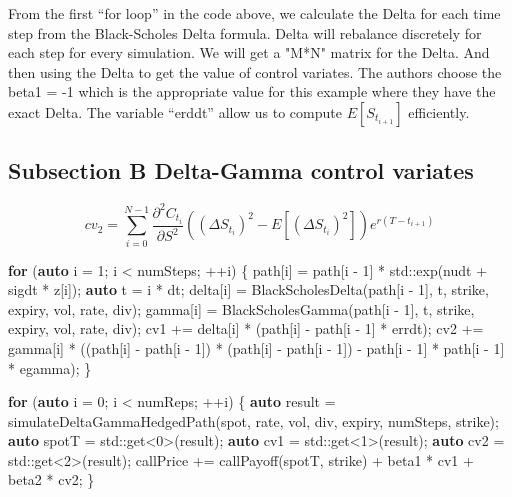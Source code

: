 \documentclass[11pt,]{article}
\newenvironment{Shaded}{\begin{snugshade}}{\end{snugshade}}
\newcommand{\BuiltInTok}[1]{#1}
\newcommand{\ControlFlowTok}[1]{\textcolor[rgb]{0.13,0.29,0.53}{\textbf{#1}}}
\newcommand{\DecValTok}[1]{\textcolor[rgb]{0.00,0.00,0.81}{#1}}
\newcommand{\KeywordTok}[1]{\textcolor[rgb]{0.13,0.29,0.53}{\textbf{#1}}}
\newcommand{\NormalTok}[1]{#1}
\begin{document}
From the first ``for loop'' in the code above, we calculate the Delta
for each time step from the Black-Scholes Delta formula. Delta will
rebalance discretely for each step for every simulation. We will get a
"M*N" matrix for the Delta. And then using the Delta to get the value of
control variates. The authors choose the beta1 = -1 which is the
appropriate value for this example where they have the exact Delta. The
variable ``erddt'' allow us to compute \(E[S_{t_{i+1}}]\) efficiently.

\hypertarget{subsection-b-delta-gamma-control-variates}{%
\subsection{Subsection B Delta-Gamma control
variates}\label{subsection-b-delta-gamma-control-variates}}

\[
cv_2 = \sum^{N-1}_{i=0} \frac{\partial^2 C_{t_i}}{\partial S^2}((\Delta S_{t_i})^2 - E[(\Delta S_{t_i})^2])e^{r(T-t_{i+1})}
\]

\begin{Shaded}
\begin{Highlighting}[]
\ControlFlowTok{for}\NormalTok{ (}\KeywordTok{auto}\NormalTok{ i = }\DecValTok{1}\NormalTok{; i < numSteps; ++i)}
\NormalTok{    \{}
\NormalTok{        path[i] = path[i - }\DecValTok{1}\NormalTok{] * }\BuiltInTok{std::}\NormalTok{exp(nudt + sigdt * z[i]);}
        \KeywordTok{auto}\NormalTok{ t = i * dt;}
\NormalTok{        delta[i] = BlackScholesDelta(path[i - }\DecValTok{1}\NormalTok{], t, strike, expiry, vol, rate, div);}
\NormalTok{        gamma[i] = BlackScholesGamma(path[i - }\DecValTok{1}\NormalTok{], t, strike, expiry, vol, rate, div);}
\NormalTok{        cv1 += delta[i] * (path[i] - path[i - }\DecValTok{1}\NormalTok{] * errdt);}
\NormalTok{        cv2 += gamma[i] * ((path[i] - path[i - }\DecValTok{1}\NormalTok{]) * (path[i] - path[i - }\DecValTok{1}\NormalTok{]) - path[i - }\DecValTok{1}\NormalTok{] * path[i - }\DecValTok{1}\NormalTok{] * egamma);}
\NormalTok{    \}}

\ControlFlowTok{for}\NormalTok{ (}\KeywordTok{auto}\NormalTok{ i = }\DecValTok{0}\NormalTok{; i < numReps; ++i)}
\NormalTok{    \{}
        \KeywordTok{auto}\NormalTok{ result = simulateDeltaGammaHedgedPath(spot, rate, vol, div, expiry, numSteps, strike);}
        \KeywordTok{auto}\NormalTok{ spotT = }\BuiltInTok{std::}\NormalTok{get<}\DecValTok{0}\NormalTok{>(result);}
        \KeywordTok{auto}\NormalTok{ cv1 = }\BuiltInTok{std::}\NormalTok{get<}\DecValTok{1}\NormalTok{>(result);}
        \KeywordTok{auto}\NormalTok{ cv2 = }\BuiltInTok{std::}\NormalTok{get<}\DecValTok{2}\NormalTok{>(result);}
\NormalTok{        callPrice += callPayoff(spotT, strike) + beta1 * cv1 + beta2 * cv2;}
\NormalTok{    \}}
\end{Highlighting}
\end{Shaded}
\end{document}
